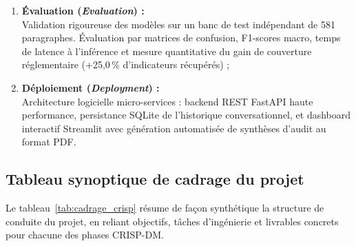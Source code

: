 \documentclass[12pt,a4paper]{report}
\begin{document}
\begin{enumerate}[label=\textbf{Phase \arabic* :}, wide=0pt]
    \item \textbf{Évaluation (\textit{Evaluation}) :}\\
    Validation rigoureuse des modèles sur un banc de test indépendant de 581 paragraphes. Évaluation par matrices de confusion, F1-scores macro, temps de latence à l'inférence et mesure quantitative du gain de couverture réglementaire (+25,0\,\% d'indicateurs récupérés) ;
    
    \item \textbf{Déploiement (\textit{Deployment}) :}\\
    Architecture logicielle micro-services : backend REST FastAPI haute performance, persistance SQLite de l'historique conversationnel, et dashboard interactif Streamlit avec génération automatisée de synthèses d'audit au format PDF.
\end{enumerate}

\subsection{Tableau synoptique de cadrage du projet}
Le tableau~\ref{tab:cadrage_crisp} résume de façon synthétique la structure de conduite du projet, en reliant objectifs, tâches d'ingénierie et livrables concrets pour chacune des phases CRISP-DM.
\end{document}
